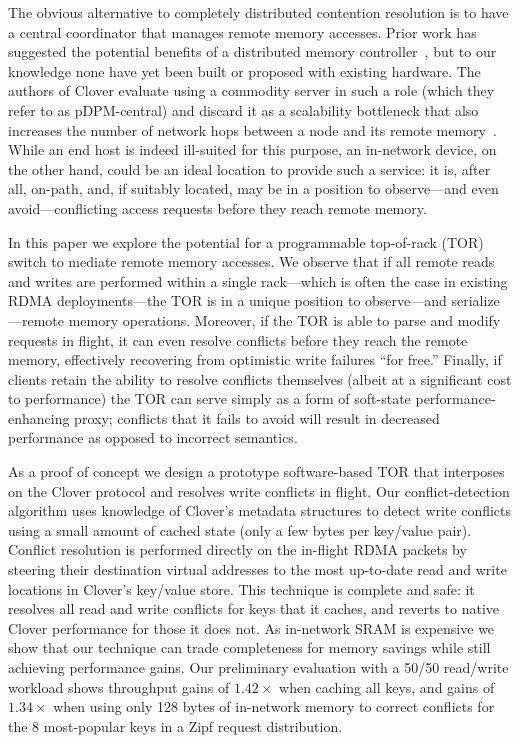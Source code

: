 The obvious alternative to completely distributed contention
resolution is to have a central coordinator that manages remote memory
accesses.  Prior work has suggested the potential benefits of a
distributed memory controller~\cite{disandapp}, but to our knowledge
none have yet been built or proposed with existing hardware.  The
authors of Clover evaluate using a commodity server in such a role
(which they refer to as pDPM-central) and discard it as a scalability
bottleneck that also increases the number of network hops between a
node and its remote memory~\cite{clover}.  While an end host is indeed
ill-suited for this purpose, an in-network device, on
the other hand, could be an ideal location to provide such a service:
it is, after all, on-path, and, if suitably located, may be in a
position to observe---and even avoid---conflicting access
requests before they reach remote memory.

In this paper we explore the potential for a programmable top-of-rack
(TOR) switch to mediate remote memory accesses.  We observe that if
all remote reads and writes are performed within a single rack---which
is often the case in existing RDMA deployments---the TOR is in a unique
position to observe---and serialize---remote memory operations.
Moreover, if the TOR is able to parse and modify requests in flight, it
can even resolve conflicts before they reach the remote memory,
effectively recovering from optimistic write failures ``for free.''
Finally, if clients retain the ability to resolve conflicts
themselves (albeit at a significant cost to performance) the TOR can
serve simply as a form of soft-state performance-enhancing proxy;
conflicts that it fails to avoid will result in
decreased performance as opposed to incorrect semantics.

As a proof of concept we design a prototype software-based TOR that
interposes on the Clover protocol and resolves write conflicts in
flight. Our conflict-detection algorithm uses knowledge of Clover's
metadata structures to detect write conflicts using a small amount of
cached state (only a few bytes per key/value pair). Conflict
resolution is performed directly on the in-flight RDMA packets by
steering their destination virtual addresses to the most up-to-date
read and write locations in Clover's key/value store. This technique
is complete and safe: it resolves all read and write conflicts for
keys that it caches, and reverts to native Clover performance for
those it does not. As in-network SRAM is expensive we show that our
technique can trade completeness for memory savings while still
achieving performance gains. Our preliminary evaluation with a 50/50
read/write workload shows throughput gains of $1.42\times$ when
caching all keys, and gains of $1.34\times$ when using only 128 bytes
of in-network memory to correct conflicts for the 8 most-popular keys
in a Zipf request distribution.
